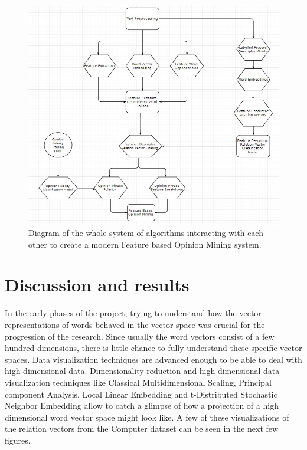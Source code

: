 \documentclass{sig-alternate}
\begin{document}
\begin{figure}
\centering
\includegraphics[scale=0.50]{images/full_technique.JPG}
\caption{Diagram of the whole system of algorithms interacting with each other to create a modern Feature based Opinion Mining system.}
\end{figure}

\section{Discussion and results}
In the early phases of the project, trying to understand how the vector representations of words behaved in the vector space was crucial for the progression of the research. Since usually the word vectors consist of a few hundred dimensions, there is little chance to fully understand these specific vector spaces. Data visualization techniques are advanced enough to be able to deal with high dimensional data. Dimensionality reduction and high dimensional data visualization techniques like Classical Multidimensional Scaling\cite{kruskal1964multidimensional}, Principal component Analysis\cite{jolliffe1986principal}, Local Linear Embedding\cite{donoho2003hessian} and t-Distributed Stochastic Neighbor Embedding\cite{Maaten2015} allow to catch a glimpse of how a projection of a high dimensional word vector space might look like. A few of these visualizations of the relation vectors from the Computer dataset can be seen in the next few figures.
\end{document}
